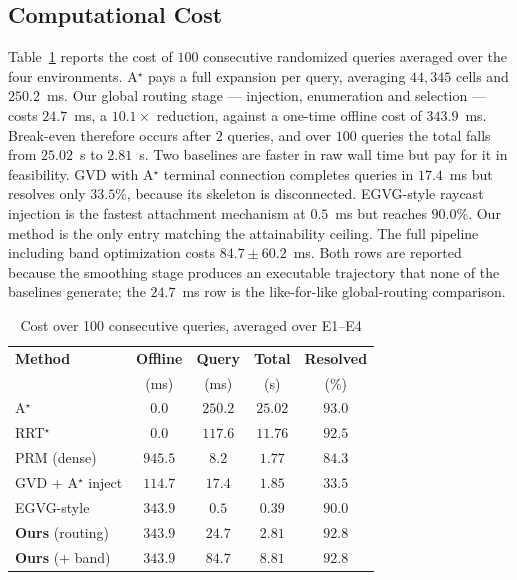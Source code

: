 \documentclass[conference]{IEEEtran}
\begin{document}
\subsection{Computational Cost}
\label{sec:res-cost}
Table~\ref{tab:compute_benchmarks} reports the cost of $100$ consecutive randomized queries averaged over the four environments. A$^\star$ pays a full expansion per query, averaging $44{,}345$ cells and $250.2$~ms. Our global routing stage --- injection, enumeration and selection --- costs $24.7$~ms, a $10.1\times$ reduction, against a one-time offline cost of $343.9$~ms. Break-even therefore occurs after $2$ queries, and over $100$ queries the total falls from $25.02$~s to $2.81$~s.
Two baselines are faster in raw wall time but pay for it in feasibility. GVD with A$^\star$ terminal connection completes queries in $17.4$~ms but resolves only $33.5\%$, because its skeleton is disconnected. EGVG-style raycast injection is the fastest attachment mechanism at $0.5$~ms but reaches $90.0\%$. Our method is the only entry matching the attainability ceiling.
The full pipeline including band optimization costs $84.7\pm60.2$~ms. Both rows are reported because the smoothing stage produces an executable trajectory that none of the baselines generate; the $24.7$~ms row is the like-for-like global-routing comparison.
\begin{table}[htbp]
\caption{Cost over 100 consecutive queries, averaged over E1--E4}
\label{tab:compute_benchmarks}
\begin{center}
\begin{tabular}{@{}lcccc@{}}
\toprule
\textbf{Method} & \textbf{Offline} & \textbf{Query} & \textbf{Total} & \textbf{Resolved} \\
 & (ms) & (ms) & (s) & (\%) \\ \midrule
A$^\star$ & $0.0$ & $250.2$ & $25.02$ & $93.0$ \\
RRT$^\star$ & $0.0$ & $117.6$ & $11.76$ & $92.5$ \\
PRM (dense) & $945.5$ & $8.2$ & $1.77$ & $84.3$ \\
GVD + A$^\star$ inject & $114.7$ & $17.4$ & $1.85$ & $33.5$ \\
EGVG-style~\cite{qi2025egvg} & $343.9$ & $0.5$ & $0.39$ & $90.0$ \\ \midrule
\textbf{Ours} (routing) & $\mathbf{343.9}$ & $\mathbf{24.7}$ & $\mathbf{2.81}$ & $\mathbf{92.8}$ \\
\textbf{Ours} (+ band) & $343.9$ & $84.7$ & $8.81$ & $92.8$ \\ \bottomrule
\end{tabular}
\end{center}
\end{table}
\end{document}
